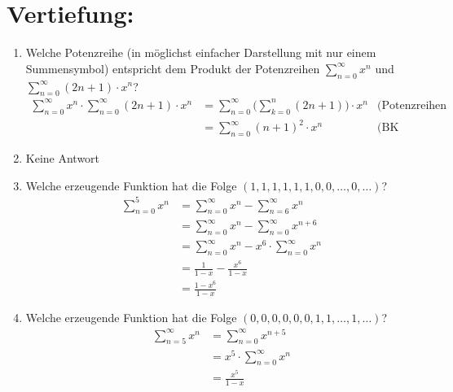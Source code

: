 



    \maketitle
    \section*{Vertiefung:}
    \begin{enumerate}[label=(\alph*)]
        \item Welche Potenzreihe (in möglichst einfacher Darstellung mit nur einem Summensymbol) 
        entspricht dem Produkt der Potenzreihen $\displaystyle\sum_{n=0}^{\infty} x^n$ und 
        $\displaystyle\sum_{n=0}^{\infty} (2n+1)\cdot x^n$?\\
        \begin{align*}
            \sum_{n=0}^{\infty} x^n \cdot \sum_{n=0}^{\infty} (2n+1)\cdot x^n &= 
            \sum_{n=0}^{\infty} \Bigg(\sum_{k=0}^{n} (2n+1)\Bigg) \cdot x^n &\textrm{(Potenzreihen Rechnenregeln)}\\
            &= \sum_{n=0}^{\infty} (n+1)^2 \cdot x^n &\textrm{(BK Proposition 3.B)}
        \end{align*}

        \item Keine Antwort

        \item Welche erzeugende Funktion hat die Folge $(1, 1, 1, 1, 1, 1, 0, 0, \ldots , 0, \ldots)$?
        \begin{align*}
            \sum_{n=0}^{5} x^n
            &=\sum_{n=0}^{\infty} x^n - \sum_{n=6}^{\infty} x^n \\
            &=\sum_{n=0}^{\infty} x^n - \sum_{n=0}^{\infty} x^{n+6} \\
            &=\sum_{n=0}^{\infty} x^n - x^6 \cdot \sum_{n=0}^{\infty} x^n \\
            &=\frac{1}{1-x} - \frac{x^6}{1-x} \\
            &=\frac{1-x^6}{1-x}
        \end{align*}

        \item Welche erzeugende Funktion hat die Folge $(0, 0, 0, 0, 0, 0, 1, 1, \ldots , 1,\ldots)$?
        \begin{align*}
            \sum_{n=5}^{\infty} x^n
            &=\sum_{n=0}^{\infty} x^{n+5} \\
            &=x^5\cdot\sum_{n=0}^{\infty} x^n \\
            &=\frac{x^5}{1-x}
        \end{align*}


\end{enumerate}
